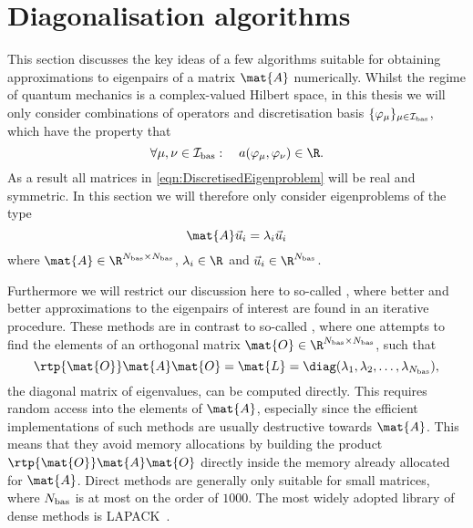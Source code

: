\section{Diagonalisation algorithms}
\label{sec:DiagAlgos}

This section discusses the key ideas of a few algorithms suitable for obtaining
approximations to eigenpairs of a matrix $\mat{A}$ numerically.
Whilst the regime of quantum mechanics is a complex-valued Hilbert space,
in this thesis
we will only consider combinations of operators and discretisation basis
$\{\varphi_\mu\}_{\mu \in \mathcal{I}_\text{bas}}$,
which have the property that
\[ \forall \mu, \nu \in \Ibas: \quad a(\varphi_\mu, \varphi_\nu) \in \R. \]
As a result all matrices in \eqref{eqn:DiscretisedEigenproblem} will be real and symmetric.
In this section we will therefore only consider eigenproblems of the type
\[ \mat{A} \vec{u}_i = \lambda_i \vec{u}_i \]
where $\mat{A} \in \R^{\Nbas \times \Nbas}$,
$\lambda_i \in \R$ and $\vec{u}_i \in \R^{\Nbas}$.

Furthermore we will restrict our discussion here to so-called
,
where better and better approximations to the eigenpairs of interest
are found in an iterative procedure.
These methods are in contrast to so-called ,
where one attempts to find the elements of an orthogonal matrix $\mat{O} \in \R^{\Nbas\times\Nbas}$,
such that
\[ \rtp{\mat{O}} \mat{A} \mat{O} = \mat{L} = \diag(\lambda_1, \lambda_2, \ldots, \lambda_{\Nbas}), \]
the diagonal matrix of eigenvalues, can be computed directly.
This requires random access into the elements of $\mat{A}$,
especially since the efficient implementations of such methods
are usually destructive towards $\mat{A}$.
This means that they avoid memory allocations by building the product
$\rtp{\mat{O}} \mat{A} \mat{O}$ directly inside the memory already allocated for $\mat{A}$.
Direct methods are generally only suitable for small matrices,
where $N_\text{bas}$ is at most on the order of $1000$.
The most widely adopted library of dense methods is LAPACK~\cite{LAPACK}.

